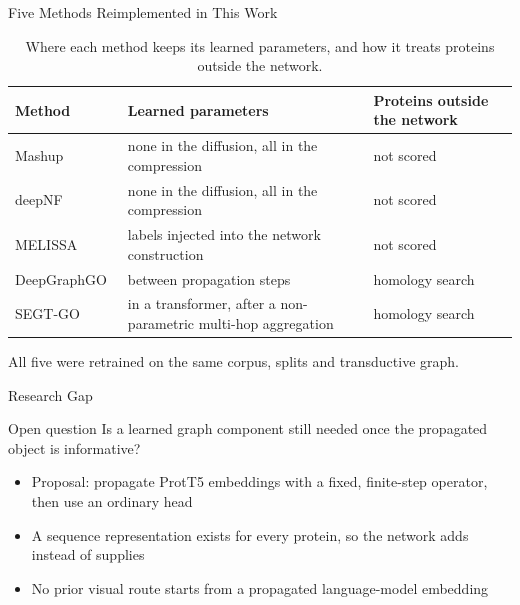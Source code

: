 \documentclass[aspectratio=169,11pt]{beamer}
\begin{document}
\begin{frame}{Five Methods Reimplemented in This Work}
  \begin{table}\footnotesize
    \caption{Where each method keeps its learned parameters, and how it treats proteins outside the network.}
    \begin{tabular}{@{}lp{6.6cm}l@{}}\toprule
      Method & Learned parameters & Proteins outside the network \\ \midrule
      Mashup~\cite{cho2016compact} & none in the diffusion, all in the compression & not scored \\
      deepNF~\cite{deepnf} & none in the diffusion, all in the compression & not scored \\
      MELISSA~\cite{wu2024melissa} & labels injected into the network construction & not scored \\
      DeepGraphGO~\cite{you_deepgraphgo_2021} & between propagation steps & homology search \\
      SEGT-GO~\cite{wang2025segtgo} & in a transformer, after a non-parametric multi-hop aggregation & homology search \\
      \bottomrule
    \end{tabular}
  \end{table}
  \vspace{0.2em}
  All five were retrained on the same corpus, splits and transductive graph.
\end{frame}

\begin{frame}{Research Gap}
  \begin{alertblock}{Open question}
    \centering Is a learned graph component still needed once the propagated object is informative?
  \end{alertblock}
  \vspace{0.5em}
  \begin{itemize}\setlength{\itemsep}{0.45em}
    \item Proposal: propagate ProtT5 embeddings with a fixed, finite-step operator, then use an ordinary head
    \item A sequence representation exists for every protein, so the network adds instead of supplies
    \item No prior visual route starts from a propagated language-model embedding
  \end{itemize}
\end{frame}

\end{document}
